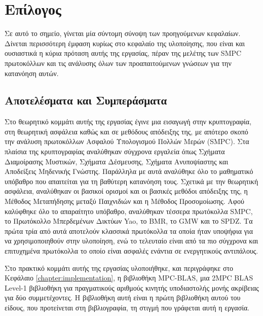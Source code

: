 \chapter{Επίλογος}
\label{chapter:postamble}

Σε αυτό το σημείο, γίνεται μία σύντομη σύνοψη των προηγούμενων κεφαλαίων. Δίνεται περισσότερη έμφαση κυρίως στο κεφαλαίο της υλοποίησης, που είναι και ουσιαστικά η κύρια πρόταση αυτής της εργασίας, πέραν της μελέτης των SMPC πρωτοκόλλων και τις ανάλυσης όλων των προαπαιτούμενων γνώσεων για την κατανόηση αυτών.

\section{Αποτελέσματα και Συμπεράσματα}

Στο θεωρητικό κομμάτι αυτής της εργασίας έγινε μια εισαγωγή στην κρυπτογραφία, στη θεωρητική ασφάλεια καθώς και σε μεθόδους απόδειξης της, με απότερο σκοπό την ανάλυση πρωτοκόλλων Ασφαλού Υπολογισμού Πολλών Μερών (SMPC). Στα πλαίσια της κρυπτογραφίας αναλύθηκαν σύγχρονα εργαλεία όπως Σχήματα Διαμοίρασης Μυστικών, Σχήματα Δέσμευσης, Σχήματα Ανυποψίαστης και Αποδείξεις Μηδενικής Γνώστης. Παράλληλα με αυτά αναλύθηκε όλο το μαθηματικό υπόβαθρο που απαιτείται για τη βαθύτερη κατανόηση τους. Σχετικά με την θεωρητική ασφάλεια, αναλύθηκαν οι βασικοί ορισμοί και οι βασικές μεθόδοι απόδειξης της, η Μέθοδος Μεταπήδησης μεταξύ Παιχνιδιών και η Μέθοδος Προσομοίωσης. Αφού καλύφθηκε όλο το απαραίτητο υπόβαθρο, αναλύθηκαν τέσσερα πρωτόκολλα SMPC, το Πρωτόκολλο Μπερδεμένων Δικτύων Yao, το BMR, το GMW και το SPDZ. Τα πρώτα τρία από αυτά αποτελούν κλασσικά πρωτόκολλα τα οποία ήταν υποψήφια για να χρησιμοποιηθούν στην υλοποίηση, ενώ το τελευταίο είναι από τα πιο σύγχρονα και επιτυχημένα πρωτόκολλα το οποίο είναι ασφαλές ενάντια σε ενεργητικούς αντιπάλους.

Στο πρακτικό κομμάτι αυτής της εργασίας υλοποιήθηκε, και περιγράφηκε στο Κεφάλαιο \ref{chapter:implementation}, η βιβλιοθήκη MPC-BLAS, μια 2MPC BLAS Level-1 βιβλιοθήκη για πραγματικούς αριθμούς κινητής υποδιαστολής μονής ακρίβειας για δύο συμμετέχοντες. Η βιβλιοθήκη αυτή είναι η πρώτη βιβλιοθήκη αυτού του είδους, που προτείνεται στη βιβλιογραφία, τη στιγμή που γράφεται αυτή η εργασία.

